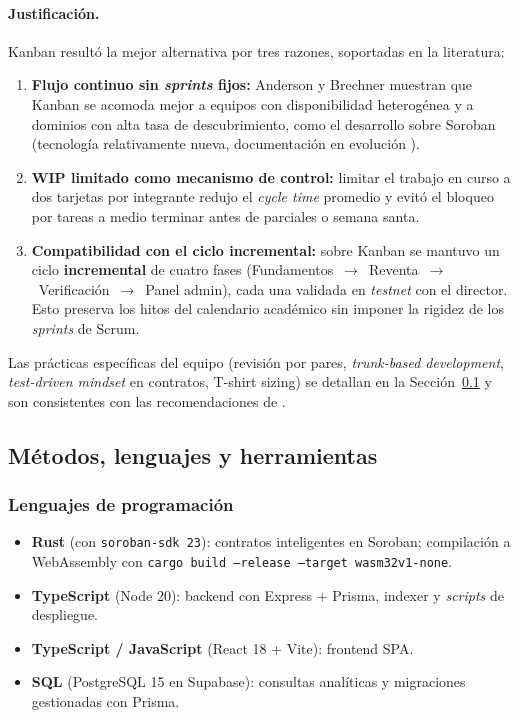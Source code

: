 \documentclass[12pt,oneside]{report}
\begin{document}
      \paragraph{Justificación.} Kanban resultó la mejor alternativa por tres razones, soportadas en la literatura:
      \begin{enumerate}
        \item \textbf{Flujo continuo sin \textit{sprints} fijos:} Anderson \cite{anderson2010} y Brechner \cite{brechner2015} muestran que Kanban se acomoda mejor a equipos con disponibilidad heterogénea y a dominios con alta tasa de descubrimiento, como el desarrollo sobre Soroban (tecnología relativamente nueva, documentación en evolución \cite{stellardocs}).
        \item \textbf{WIP limitado como mecanismo de control:} limitar el trabajo en curso a dos tarjetas por integrante redujo el \textit{cycle time} promedio y evitó el bloqueo por tareas a medio terminar antes de parciales o semana santa.
        \item \textbf{Compatibilidad con el ciclo incremental:} sobre Kanban se mantuvo un ciclo \textbf{incremental} de cuatro fases (Fundamentos~$\rightarrow$~Reventa~$\rightarrow$~Verificación~$\rightarrow$~Panel admin), cada una validada en \textit{testnet} con el director. Esto preserva los hitos del calendario académico sin imponer la rigidez de los \textit{sprints} de Scrum.
      \end{enumerate}

      Las prácticas específicas del equipo (revisión por pares, \textit{trunk-based development}, \textit{test-driven mindset} en contratos, T-shirt sizing) se detallan en la Sección~\ref{subsec:herramientas} y son consistentes con las recomendaciones de \cite{anderson2010,beck2002,humble2010}.

    \subsection{Métodos, lenguajes y herramientas}
    \label{subsec:herramientas}

      \subsubsection{Lenguajes de programación}
      \begin{itemize}
        \item \textbf{Rust} (con \texttt{soroban-sdk 23}): contratos inteligentes en Soroban; compilación a WebAssembly con \texttt{cargo build --release --target wasm32v1-none}.
        \item \textbf{TypeScript} (Node 20): backend con Express + Prisma, indexer y \textit{scripts} de despliegue.
        \item \textbf{TypeScript / JavaScript} (React 18 + Vite): frontend SPA.
        \item \textbf{SQL} (PostgreSQL 15 en Supabase): consultas analíticas y migraciones gestionadas con Prisma.
      \end{itemize}
\end{document}
